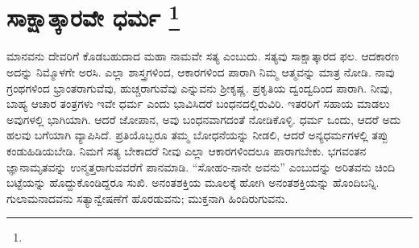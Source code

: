 
\chapter[ಸಾಕ್ಷಾತ್ಕಾರವೇ ಧರ್ಮ ]{ಸಾಕ್ಷಾತ್ಕಾರವೇ ಧರ್ಮ \protect\footnote{}}

ಮಾನವನು ದೇವರಿಗೆ ಕೊಡಬಹುದಾದ ಮಹಾ ನಾಮವೇ ಸತ್ಯ ಎಂಬುದು. ಸತ್ಯವು ಸಾಕ್ಷಾತ್ಕಾರದ ಫಲ. ಆದಕಾರಣ ಅದನ್ನು ನಿಮ್ಮೊಳಗೇ ಅರಸಿ. ಎಲ್ಲಾ ಶಾಸ್ತ್ರಗಳಿಂದ, ಆಕಾರಗಳಿಂದ ಪಾರಾಗಿ ನಿಮ್ಮ ಆತ್ಮವನ್ನು ಮಾತ್ರ ನೋಡಿ. ನಾವು ಗ್ರಂಥಗಳಿಂದ ಭ್ರಾಂತರಾಗುವೆವು, ಹುಚ್ಚರಾಗುವೆವು ಎನ್ನುವನು ಶ‍್ರೀಕೃಷ್ಣ. ಪ್ರಕೃತಿಯ ದ್ವಂದ್ವದಿಂದ ಪಾರಾಗಿ. ನೀವು, ಬಾಹ್ಯ ಆಚಾರ ತಂತ್ರಗಳು ಇವೇ ಧರ್ಮ ಎಂದು ಭಾವಿಸಿದರೆ ಬಂಧನದಲ್ಲಿರುವಿರಿ. ಇತರರಿಗೆ ಸಹಾಯ ಮಾಡಲು ಅವುಗಳಲ್ಲಿ ಭಾಗಿಯಾಗಿ. ಆದರೆ ಜೋಪಾನ, ಅವು ಬಂಧನವಾಗದಂತೆ ನೋಡಿಕೊಳ್ಳಿ. ಧರ್ಮ ಒಂದು, ಆದರೆ ಅದು ಹಲವು ಬಗೆಯಾಗಿ ವ್ಯಾಪಿಸಿದೆ. ಪ್ರತಿಯೊಬ್ಬರೂ ತಮ್ಮ ಬೋಧನೆಯನ್ನು ನೀಡಲಿ, ಆದರೆ ಅನ್ಯಧರ್ಮಗಳಲ್ಲಿ ತಪ್ಪು ಕಂಡುಹಿಡಿಯಬೇಡಿ. ನಿಮಗೆ ಸತ್ಯ ಬೇಕಾದರೆ ನೀವು ಎಲ್ಲಾ ಆಕಾರಗಳಿಂದಲೂ ಪಾರಾಗಬೇಕು. ಭಗವಂತನ ಜ್ಞಾನಾಮೃತವನ್ನು ಉನ್ಮತ್ತರಾಗುವವರೆಗೆ ಪಾನಮಾಡಿ. “ಸೋಹಂ-ನಾನೇ ಅವನು” ಎಂಬುದನ್ನು ಅರಿತವನು ಚಿಂದಿ ಬಟ್ಟೆಯನ್ನು ಹೊದ್ದುಕೊಂಡಿದ್ದರೂ ಸುಖಿ. ಅನಂತಶಕ್ತಿಯ ಮೂಲಕ್ಕೆ ಹೋಗಿ ಅನಂತಶಕ್ತಿಯನ್ನು ಹೊಂದಿಬನ್ನಿ. ಗುಲಾಮನಾದವನು ಸತ್ಯಾನ್ವೇಷಣೆಗೆ ಹೊರಡುವನು; ಮುಕ್ತನಾಗಿ ಹಿಂದಿರುಗುವನು.

